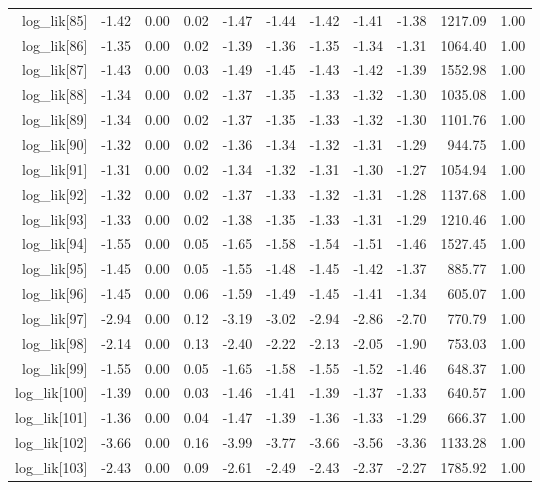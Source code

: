 \begin{table}[ht]
\begin{tabular}{rrrrrrrrrrr}
  log\_lik[85] & -1.42 & 0.00 & 0.02 & -1.47 & -1.44 & -1.42 & -1.41 & -1.38 & 1217.09 & 1.00 \\ 
  log\_lik[86] & -1.35 & 0.00 & 0.02 & -1.39 & -1.36 & -1.35 & -1.34 & -1.31 & 1064.40 & 1.00 \\ 
  log\_lik[87] & -1.43 & 0.00 & 0.03 & -1.49 & -1.45 & -1.43 & -1.42 & -1.39 & 1552.98 & 1.00 \\ 
  log\_lik[88] & -1.34 & 0.00 & 0.02 & -1.37 & -1.35 & -1.33 & -1.32 & -1.30 & 1035.08 & 1.00 \\ 
  log\_lik[89] & -1.34 & 0.00 & 0.02 & -1.37 & -1.35 & -1.33 & -1.32 & -1.30 & 1101.76 & 1.00 \\ 
  log\_lik[90] & -1.32 & 0.00 & 0.02 & -1.36 & -1.34 & -1.32 & -1.31 & -1.29 & 944.75 & 1.00 \\ 
  log\_lik[91] & -1.31 & 0.00 & 0.02 & -1.34 & -1.32 & -1.31 & -1.30 & -1.27 & 1054.94 & 1.00 \\ 
  log\_lik[92] & -1.32 & 0.00 & 0.02 & -1.37 & -1.33 & -1.32 & -1.31 & -1.28 & 1137.68 & 1.00 \\ 
  log\_lik[93] & -1.33 & 0.00 & 0.02 & -1.38 & -1.35 & -1.33 & -1.31 & -1.29 & 1210.46 & 1.00 \\ 
  log\_lik[94] & -1.55 & 0.00 & 0.05 & -1.65 & -1.58 & -1.54 & -1.51 & -1.46 & 1527.45 & 1.00 \\ 
  log\_lik[95] & -1.45 & 0.00 & 0.05 & -1.55 & -1.48 & -1.45 & -1.42 & -1.37 & 885.77 & 1.00 \\ 
  log\_lik[96] & -1.45 & 0.00 & 0.06 & -1.59 & -1.49 & -1.45 & -1.41 & -1.34 & 605.07 & 1.00 \\ 
  log\_lik[97] & -2.94 & 0.00 & 0.12 & -3.19 & -3.02 & -2.94 & -2.86 & -2.70 & 770.79 & 1.00 \\ 
  log\_lik[98] & -2.14 & 0.00 & 0.13 & -2.40 & -2.22 & -2.13 & -2.05 & -1.90 & 753.03 & 1.00 \\ 
  log\_lik[99] & -1.55 & 0.00 & 0.05 & -1.65 & -1.58 & -1.55 & -1.52 & -1.46 & 648.37 & 1.00 \\ 
  log\_lik[100] & -1.39 & 0.00 & 0.03 & -1.46 & -1.41 & -1.39 & -1.37 & -1.33 & 640.57 & 1.00 \\ 
  log\_lik[101] & -1.36 & 0.00 & 0.04 & -1.47 & -1.39 & -1.36 & -1.33 & -1.29 & 666.37 & 1.00 \\ 
  log\_lik[102] & -3.66 & 0.00 & 0.16 & -3.99 & -3.77 & -3.66 & -3.56 & -3.36 & 1133.28 & 1.00 \\ 
  log\_lik[103] & -2.43 & 0.00 & 0.09 & -2.61 & -2.49 & -2.43 & -2.37 & -2.27 & 1785.92 & 1.00 \\ 

\end{tabular}
\end{table}
